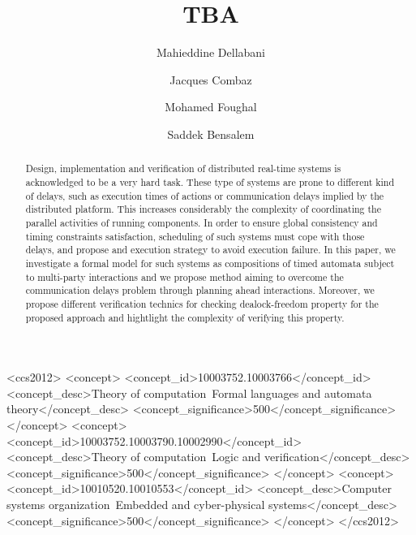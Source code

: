 \documentclass[format=acmtog]{acmart}
\begin{document}
\title{TBA}
\author{Mahieddine Dellabani}
\author{Jacques Combaz}
\author{Mohamed Foughal}
\author{Saddek Bensalem}



\renewcommand\shortauthors{Dellabani, Combaz, Foughal et al}



\begin{abstract}
Design, implementation and verification of distributed real-time systems is acknowledged to be a very hard task.
These type of systems are prone to different kind of delays, such as execution times of actions or communication delays implied by the distributed platform.
This increases considerably the complexity of coordinating the parallel activities of running components.
In order to ensure global consistency and timing constraints satisfaction, scheduling of such systems must cope with those delays, and propose and execution strategy to avoid execution failure. 
In this paper, we investigate a formal model for such systems as compositions of timed automata subject to multi-party interactions and we propose 
method aiming to overcome the communication delays problem through planning ahead interactions. Moreover, we propose different verification technics for checking dealock-freedom property for the proposed approach and hightlight the complexity of verifying this property.
\end{abstract}


\begin{CCSXML}
  <ccs2012>
  <concept>
  <concept_id>10003752.10003766</concept_id>
  <concept_desc>Theory of computation~Formal languages and automata theory</concept_desc>
  <concept_significance>500</concept_significance>
  </concept>
  <concept>
  <concept_id>10003752.10003790.10002990</concept_id>
  <concept_desc>Theory of computation~Logic and verification</concept_desc>
  <concept_significance>500</concept_significance>
  </concept>
  <concept>
  <concept_id>10010520.10010553</concept_id>
  <concept_desc>Computer systems organization~Embedded and cyber-physical systems</concept_desc>
  <concept_significance>500</concept_significance>
  </concept>
  </ccs2012>
\end{CCSXML}
\end{document}
